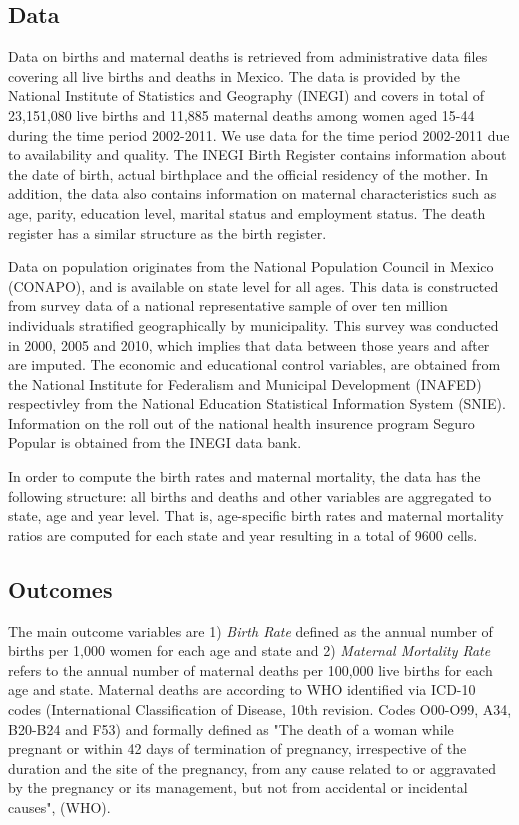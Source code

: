 \documentclass[a4paper, 11pt]{article}
\begin{document}
\begin{spacing}{1.5}
\begin{multicols}{2}
\subsection{Data}
 Data on births and maternal deaths is retrieved from administrative data files covering all live births and deaths in Mexico. The data is provided by the National Institute of Statistics and Geography (INEGI) and covers in total of 23,151,080 live births and 11,885 maternal deaths among women aged 15-44 during the time period 2002-2011. We use data for the time period 2002-2011 due to availability and quality. The INEGI Birth Register contains information about the date of birth, actual birthplace and the official residency of the mother. In addition, the data also contains information on maternal characteristics such as age, parity, education level, marital status and employment status. The death register has a similar structure as the birth register.
 
 Data on population originates from the National Population Council in Mexico (CONAPO), and is available on state level for all ages. This data is constructed from survey data of a national representative sample of over ten million individuals stratified geographically by municipality. This survey was conducted in 2000, 2005 and 2010, which implies that data between those years and after are imputed.  The economic and educational control variables, are obtained from the National Institute for Federalism and Municipal Development (INAFED) respectivley from the National Education Statistical Information System (SNIE). Information on the roll out of the national health insurence program Seguro Popular is obtained from the INEGI data bank.
 
 In order to compute the birth rates and maternal mortality, the data has the following structure: all births and deaths and other variables are aggregated to state, age and year level. That is, age-specific birth rates and maternal mortality ratios are computed for each state and year resulting in a total of 9600 cells.
 
 
\subsection{Outcomes} 
 The main outcome variables are 1) \textit{Birth Rate} defined as the annual number of births per 1,000 women for each age and state and 2) \textit{Maternal Mortality Rate} refers to the annual number of maternal deaths per 100,000 live births for each age and state. Maternal deaths are according to WHO identified via ICD-10 codes (International Classification of Disease, 10th revision. Codes O00-O99, A34, B20-B24 and F53) and formally defined as "The death of a woman while pregnant or within 42 days of termination of pregnancy, irrespective of the duration and the site of the pregnancy, from any cause related to or aggravated by the pregnancy or its management, but not from accidental or incidental causes", (WHO).

\end{multicols}
\end{spacing}
\end{document}
